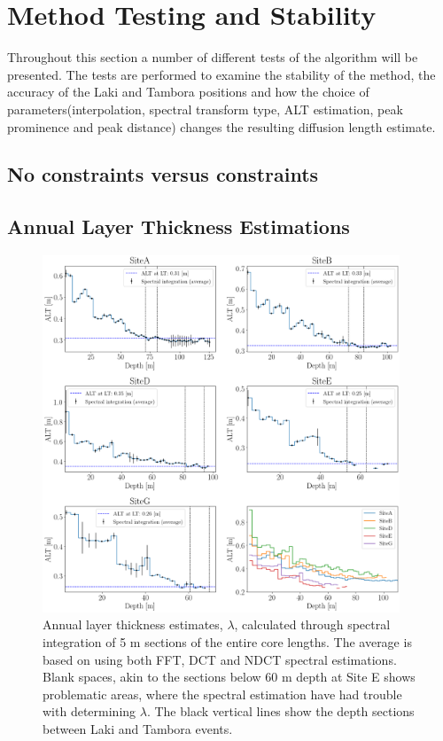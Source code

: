 \documentclass[../../CompleteThesis2/Complete_2ndDraft]{subfiles}
\begin{document}
\section[Testing and Stability][Testing and Stability]{Method Testing and Stability}
\label{Sec:Method_TestStab}

Throughout this section a number of different tests of the algorithm will be presented. The tests are performed to examine the stability of the method, the accuracy of the Laki and Tambora positions and how the choice of parameters(interpolation, spectral transform type, ALT estimation, peak prominence and peak distance) changes the resulting diffusion length estimate. 

\subsection[Constraints or No Constraints]{No constraints versus constraints}
\label{Subsec:Method_TestStab_ConstNoConst}


\subsection[ALT Estimation]{Annual Layer Thickness Estimations}
\label{Subsec:Method_TestStab_ALTest}

\begin{figure}[h]
	\centering
	\includegraphics[width=0.95\textwidth]{AllCores_ALTs.png}
	\caption[$\lambda$ for Full Cores]{\small Annual layer thickness estimates, $\lambda$, calculated through spectral integration of 5 m sections of the entire core lengths. The average is based on using both FFT, DCT and NDCT spectral estimations. Blank spaces, akin to the sections below 60 m depth at Site E shows problematic areas, where the spectral estimation have had trouble with determining $\lambda$. The black vertical lines show the depth sections between Laki and Tambora events.}
	\label{fig:AllCores_ALTs}
\end{figure}
\end{document}
